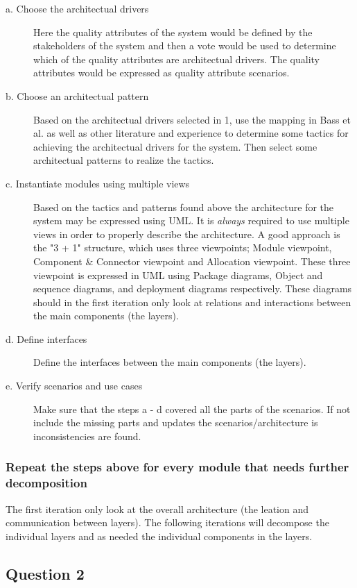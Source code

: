 \begin{description}
    \item[a. Choose the architectual drivers]
  Here the quality attributes of the system would be defined by the stakeholders of the system and then a vote would be used to determine which of the quality attributes are architectual drivers. The quality attributes would be expressed as quality attribute scenarios.
    \item[b. Choose an architectual pattern]
  Based on the architectual drivers selected in 1, use the mapping in Bass et al. as well as other literature and experience to determine some tactics for achieving the architectual drivers for the system. Then select some architectual patterns to realize the tactics.
    \item[c. Instantiate modules using multiple views]
  Based on the tactics and patterns found above the architecture for the system may be expressed using UML. It is \emph{always} required to use multiple views in order to properly describe the architecture. A good approach is the "3 + 1" structure, which uses three viewpoints; Module viewpoint, Component \& Connector viewpoint and Allocation viewpoint. These three viewpoint is expressed in UML using Package diagrams, Object and sequence diagrams, and deployment diagrams respectively. These diagrams should in the first iteration only look at relations and interactions between the main components (the layers).
    \item[d. Define interfaces]
  Define the interfaces between the main components (the layers).
    \item[e. Verify scenarios and use cases]
  Make sure that the steps a - d covered all the parts of the scenarios. If not include the missing parts and updates the scenarios/architecture is inconsistencies are found.
\end{description}
\subsubsection{Repeat the steps above for every module that needs further decomposition}
The first iteration only look at the overall architecture (the leation and communication between layers). The following iterations will decompose the individual layers and as needed the individual components in the layers.
\subsection{Question 2}

